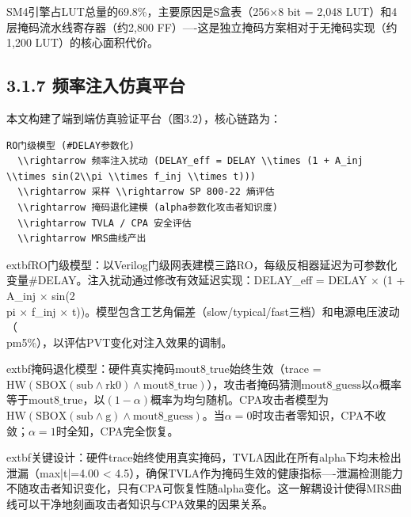 \documentclass[journal]{IEEEtran}
\begin{document}
SM4引擎占LUT总量的69.8\%，主要原因是S盒表（256$\times$8 bit = 2,048 LUT）和4层掩码流水线寄存器（约2,800 FF）----这是独立掩码方案相对于无掩码实现（约1,200 LUT）的核心面积代价。

\subsection{3.1.7 频率注入仿真平台}

本文构建了端到端仿真验证平台（图3.2），核心链路为：

\begin{lstlisting}[breaklines=true]
RO门级模型 (#DELAY参数化)
  \\rightarrow 频率注入扰动 (DELAY_eff = DELAY \\times (1 + A_inj \\times sin(2\\pi \\times f_inj \\times t)))
  \\rightarrow 采样 \\rightarrow SP 800-22 熵评估
  \\rightarrow 掩码退化建模 (alpha参数化攻击者知识度)
  \\rightarrow TVLA / CPA 安全评估
  \\rightarrow MRS曲线产出
\end{lstlisting}

	extbf{RO门级模型}：以Verilog门级网表建模三路RO，每级反相器延迟为可参数化变量\#DELAY。注入扰动通过修改有效延迟实现：DELAY\_eff = DELAY $\times$ (1 + A\_inj $\times$ sin(2\\pi $\times$ f\_inj $\times$ t))。模型包含工艺角偏差（slow/typical/fast三档）和电源电压波动（\\pm5\%），以评估PVT变化对注入效果的调制。

	extbf{掩码退化模型}：硬件真实掩码$\text{mout8\_true}$始终生效（trace = $\text{HW}(\text{SBOX}(\text{sub}\wedge\text{rk0}) \wedge \text{mout8\_true})$），攻击者掩码猜测$\text{mout8\_guess}$以$\alpha$概率等于$\text{mout8\_true}$，以$(1-\alpha)$概率为均匀随机。CPA攻击者模型为$\text{HW}(\text{SBOX}(\text{sub}\wedge\text{g}) \wedge \text{mout8\_guess})$。当$\alpha=0$时攻击者零知识，CPA不收敛；$\alpha=1$时全知，CPA完全恢复。

	extbf{关键设计}：硬件trace始终使用真实掩码，TVLA因此在所有alpha下均未检出泄漏（max|t|=4.00 < 4.5），确保TVLA作为掩码生效的健康指标----泄漏检测能力不随攻击者知识变化，只有CPA可恢复性随alpha变化。这一解耦设计使得MRS曲线可以干净地刻画攻击者知识与CPA效果的因果关系。
\end{document}
